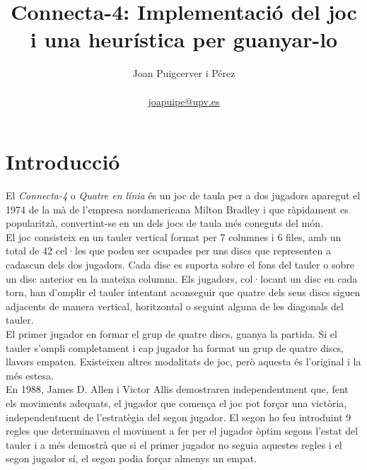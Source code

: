 \documentclass[12pt,a4paper]{article}
\author{Joan Puigcerver i Pérez\\
\begin{footnotesize}\href{mailto:joapuipe@upv.es}{joapuipe@upv.es}\end{footnotesize}}
\title{Connecta-4: Implementació del joc i una heurística per guanyar-lo}
\begin{document}
\maketitle
{}

\section{Introducció}
El \emph{Connecta-4} o \emph{Quatre en línia} és un joc de taula per a dos jugadors aparegut el 1974 de la mà de l'empresa nordamericana Milton Bradley i que ràpidament es popularitzà, convertint-se en un dels jocs de taula més coneguts del món.\\

El joc consisteix en un tauler vertical format per 7 columnes i 6 files, amb un total de 42 cel·les que poden ser ocupades per uns discs que representen a cadascun dels dos jugadors. Cada disc es suporta sobre el fons del tauler o sobre un disc anterior en la mateixa columna. Els jugadors, col·locant un disc en cada torn, han d'omplir el tauler intentant aconseguir que quatre dels seus discs siguen adjacents de manera vertical, horitzontal o seguint alguna de les diagonals del tauler.\\

El primer jugador en formar el grup de quatre discs, guanya la partida. Si el tauler s'ompli completament i cap jugador ha format un grup de quatre discs, llavors empaten. Existeixen altres modalitats de joc, però aquesta és l'original i la més estesa.\\

En 1988, James D. Allen\cite{allen1989note} i Victor Allis\cite{allis1988knowledge} demostraren independentment que, fent els moviments adequats, el jugador que comença el joc pot forçar una victòria, independentment de l'estratègia del segon jugador. El segon ho feu introduint 9 regles que determinaven el moviment a fer per el jugador òptim segons l'estat del tauler i a més demostrà que si el primer jugador no seguia aquestes regles i el segon jugador sí, el segon podia forçar almenys un empat.\\
\end{document}
